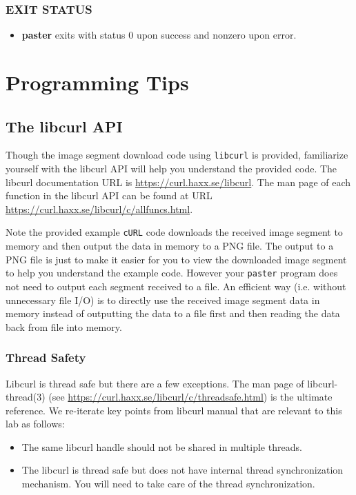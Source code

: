 \subsubsection*{EXIT STATUS}
\begin{itemize}
\item[]
  {\bf paster} exits with status 0 upon success and nonzero upon error.
\end{itemize}

\section{Programming Tips}
\label{sec:code-walk-through}

\subsection{The libcurl API}
Though the image segment download code using \verb+libcurl+ is provided, familiarize yourself with the libcurl API will help you understand the provided code. The libcurl documentation URL is \url{https://curl.haxx.se/libcurl}. The man page of each function in the libcurl API can be found at URL \url{https://curl.haxx.se/libcurl/c/allfuncs.html}.

Note the provided example \verb+cURL+ code downloads the received image segment to memory and then output the data in memory to a PNG file. The output to a PNG file is just to make it easier for you to view the downloaded image segment to help you understand the example code. However your \verb+paster+ program does not need to output each segment received to a file. An efficient way (i.e. without unnecessary file I/O) is to directly use the received image segment data in memory instead of outputting the data to a file first and then reading the data back from file into memory. 


\subsubsection{Thread Safety}
\label{sec:libcurl-thread-safety}

Libcurl is thread safe but there are a few exceptions. The man page of libcurl-thread(3) (see \url{https://curl.haxx.se/libcurl/c/threadsafe.html}) is the ultimate reference. We re-iterate key points from libcurl manual that are relevant to this lab as follows:
\begin{itemize}
\item The same libcurl handle should not be shared in multiple threads. 
\item The libcurl is thread safe but does not have internal thread synchronization mechanism. You will need to take care of the thread synchronization.
\end{itemize}


